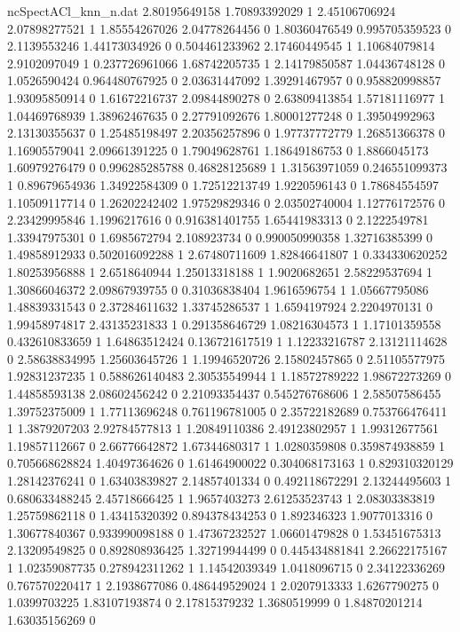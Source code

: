\begin{filecontents}{ncSpectACl_knn_n.dat}
2.80195649158 1.70893392029 1
2.45106706924 2.07898277521 1
1.85554267026 2.04778264456 0
1.80360476549 0.995705359523 0
2.1139553246 1.44173034926 0
0.504461233962 2.17460449545 1
1.10684079814 2.9102097049 1
0.237726961066 1.68742205735 1
2.14179850587 1.04436748128 0
1.0526590424 0.964480767925 0
2.03631447092 1.39291467957 0
0.958820998857 1.93095850914 0
1.61672216737 2.09844890278 0
2.63809413854 1.57181116977 1
1.04469768939 1.38962467635 0
2.27791092676 1.80001277248 0
1.39504992963 2.13130355637 0
1.25485198497 2.20356257896 0
1.97737772779 1.26851366378 0
1.16905579041 2.09661391225 0
1.79049628761 1.18649186753 0
1.8866045173 1.60979276479 0
0.996285285788 0.46828125689 1
1.31563971059 0.246551099373 1
0.89679654936 1.34922584309 0
1.72512213749 1.9220596143 0
1.78684554597 1.10509117714 0
1.26202242402 1.97529829346 0
2.03502740004 1.12776172576 0
2.23429995846 1.1996217616 0
0.916381401755 1.65441983313 0
2.1222549781 1.33947975301 0
1.6985672794 2.108923734 0
0.990050990358 1.32716385399 0
1.49858912933 0.502016092288 1
2.67480711609 1.82846641807 1
0.334330620252 1.80253956888 1
2.6518640944 1.25013318188 1
1.9020682651 2.58229537694 1
1.30866046372 2.09867939755 0
0.31036838404 1.9616596754 1
1.05667795086 1.48839331543 0
2.37284611632 1.33745286537 1
1.6594197924 2.2204970131 0
1.99458974817 2.43135231833 1
0.291358646729 1.08216304573 1
1.17101359558 0.432610833659 1
1.64863512424 0.136721617519 1
1.12233216787 2.13121114628 0
2.58638834995 1.25603645726 1
1.19946520726 2.15802457865 0
2.51105577975 1.92831237235 1
0.588626140483 2.30535549944 1
1.18572789222 1.98672273269 0
1.44858593138 2.08602456242 0
2.21093354437 0.545276768606 1
2.58507586455 1.39752375009 1
1.77113696248 0.761196781005 0
2.35722182689 0.753766476411 1
1.3879207203 2.92784577813 1
1.20849110386 2.49123802957 1
1.99312677561 1.19857112667 0
2.66776642872 1.67344680317 1
1.0280359808 0.359874938859 1
0.705668628824 1.40497364626 0
1.61464900022 0.304068173163 1
0.829310320129 1.28142376241 0
1.63403839827 2.14857401334 0
0.492118672291 2.13244495603 1
0.680633488245 2.45718666425 1
1.9657403273 2.61253523743 1
2.08303383819 1.25759862118 0
1.43415320392 0.894378434253 0
1.892346323 1.9077013316 0
1.30677840367 0.933990098188 0
1.47367232527 1.06601479828 0
1.53451675313 2.13209549825 0
0.892808936425 1.32719944499 0
0.445434881841 2.26622175167 1
1.02359087735 0.278942311262 1
1.14542039349 1.0418096715 0
2.34122336269 0.767570220417 1
2.1938677086 0.486449529024 1
2.0207913333 1.6267790275 0
1.0399703225 1.83107193874 0
2.17815379232 1.3680519999 0
1.84870201214 1.63035156269 0

\end{filecontents}
